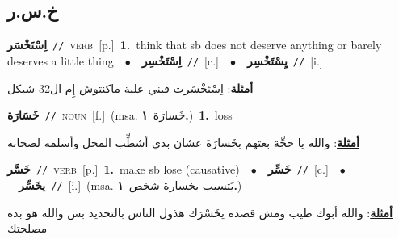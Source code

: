 \documentclass[10pt,a4paper,twoside]{article} %
\begin{document}
\begin{multicols}{2}
\vspace{-3mm}
\subsection*{\color{blue}\foreignlanguage{arabic}{خ.س.ر}\color{blue}{}} 

{\setlength\topsep{0pt}\textbf{\foreignlanguage{arabic}{اِسْتَخْسَر}}\ {\color{gray}\texttt{//}\color{black}}\ \textsc{verb}\ [p.]\ \textbf{1.}~think that sb does not deserve anything or barely deserves a little thing\ \ $\bullet$\ \ \setlength\topsep{0pt}\textbf{\foreignlanguage{arabic}{اِسْتَخْسِر}}\ {\color{gray}\texttt{//}\color{black}}\ [c.]\ \ $\bullet$\ \ \setlength\topsep{0pt}\textbf{\foreignlanguage{arabic}{يِسْتَخْسِر}}\ {\color{gray}\texttt{//}\color{black}}\ [i.]\  \begin{flushright}\color{gray}\foreignlanguage{arabic}{\textbf{\underline{\foreignlanguage{arabic}{أمثلة}}}: اِسْتَخْسَرت فيني علبة ماكنتوش إِم ال32 شيكل}\end{flushright}\color{black}} \vspace{2mm}

{\setlength\topsep{0pt}\textbf{\foreignlanguage{arabic}{خَسَارَة}}\ {\color{gray}\texttt{//}\color{black}}\ \textsc{noun}\ [f.]\ \color{gray}(msa. \foreignlanguage{arabic}{خَسارَة}~\foreignlanguage{arabic}{\textbf{١.}})\color{black}\ \textbf{1.}~loss\  \begin{flushright}\color{gray}\foreignlanguage{arabic}{\textbf{\underline{\foreignlanguage{arabic}{أمثلة}}}: والله يا حجِّة بعتهم بخَسارَة عشان بدي أشطِّب المحل وأسلمه لصحابه}\end{flushright}\color{black}} \vspace{2mm}

{\setlength\topsep{0pt}\textbf{\foreignlanguage{arabic}{خَسَّر}}\ {\color{gray}\texttt{//}\color{black}}\ \textsc{verb}\ [p.]\ \textbf{1.}~make sb lose (causative)\ \ $\bullet$\ \ \setlength\topsep{0pt}\textbf{\foreignlanguage{arabic}{خَسِّر}}\ {\color{gray}\texttt{//}\color{black}}\ [c.]\ \ $\bullet$\ \ \setlength\topsep{0pt}\textbf{\foreignlanguage{arabic}{يخَسِّر}}\ {\color{gray}\texttt{//}\color{black}}\ [i.]\ \color{gray}(msa. \foreignlanguage{arabic}{يَتسبب بخسارة شخص}~\foreignlanguage{arabic}{\textbf{١.}})\color{black}\  \begin{flushright}\color{gray}\foreignlanguage{arabic}{\textbf{\underline{\foreignlanguage{arabic}{أمثلة}}}: والله أبوك طيب ومش قصده يخَسْرَك هذول الناس بالتحديد بس والله هو بده مصلحتك}\end{flushright}\color{black}} \vspace{2mm}


\end{multicols}
\end{document}
